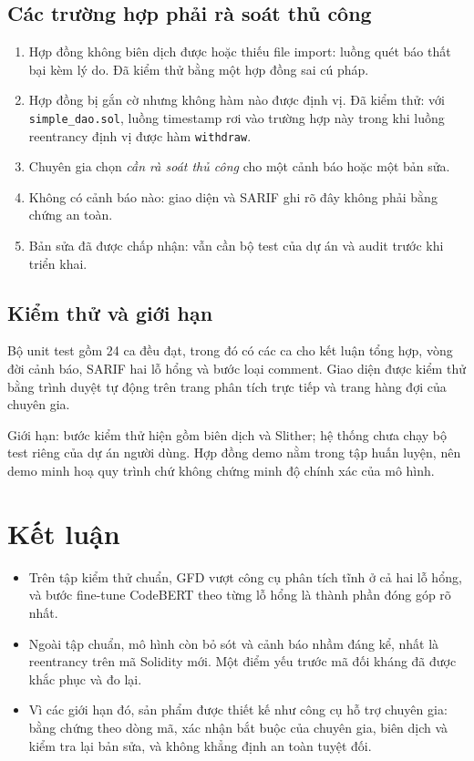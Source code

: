 \documentclass[12pt,a4paper]{article}
\newcommand{\code}[1]{\texttt{#1}}
\begin{document}
\subsection{Các trường hợp phải rà soát thủ công}
\begin{enumerate}
\item Hợp đồng không biên dịch được hoặc thiếu file import: luồng quét báo thất bại kèm lý do. Đã kiểm thử bằng một hợp đồng sai cú pháp.
\item Hợp đồng bị gắn cờ nhưng không hàm nào được định vị. Đã kiểm thử: với \code{simple\_dao.sol}, luồng timestamp rơi vào trường hợp này trong khi luồng reentrancy định vị được hàm \code{withdraw}.
\item Chuyên gia chọn \emph{cần rà soát thủ công} cho một cảnh báo hoặc một bản sửa.
\item Không có cảnh báo nào: giao diện và SARIF ghi rõ đây không phải bằng chứng an toàn.
\item Bản sửa đã được chấp nhận: vẫn cần bộ test của dự án và audit trước khi triển khai.
\end{enumerate}

\subsection{Kiểm thử và giới hạn}
Bộ unit test gồm 24 ca đều đạt, trong đó có các ca cho kết luận tổng hợp, vòng đời cảnh báo, SARIF hai lỗ hổng và bước loại comment. Giao diện được kiểm thử bằng trình duyệt tự động trên trang phân tích trực tiếp và trang hàng đợi của chuyên gia.

Giới hạn: bước kiểm thử hiện gồm biên dịch và Slither; hệ thống chưa chạy bộ test riêng của dự án người dùng. Hợp đồng demo nằm trong tập huấn luyện, nên demo minh hoạ quy trình chứ không chứng minh độ chính xác của mô hình.

\section{Kết luận}
\begin{itemize}
\item Trên tập kiểm thử chuẩn, GFD vượt công cụ phân tích tĩnh ở cả hai lỗ hổng, và bước fine-tune CodeBERT theo từng lỗ hổng là thành phần đóng góp rõ nhất.
\item Ngoài tập chuẩn, mô hình còn bỏ sót và cảnh báo nhầm đáng kể, nhất là reentrancy trên mã Solidity mới. Một điểm yếu trước mã đối kháng đã được khắc phục và đo lại.
\item Vì các giới hạn đó, sản phẩm được thiết kế như công cụ hỗ trợ chuyên gia: bằng chứng theo dòng mã, xác nhận bắt buộc của chuyên gia, biên dịch và kiểm tra lại bản sửa, và không khẳng định an toàn tuyệt đối.
\end{itemize}
\end{document}

